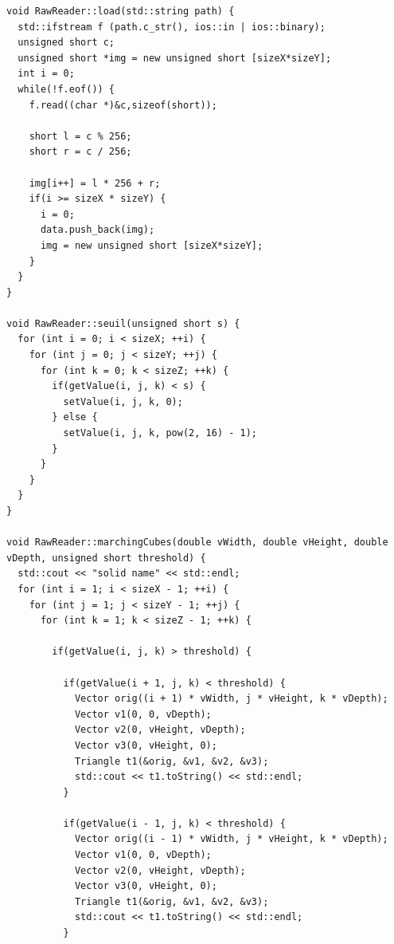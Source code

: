 \documentclass [a4 paper,11pt]{report}
\begin{document}
\begin{lstlisting}
void RawReader::load(std::string path) {
  std::ifstream f (path.c_str(), ios::in | ios::binary);
  unsigned short c;
  unsigned short *img = new unsigned short [sizeX*sizeY];
  int i = 0;
  while(!f.eof()) {
    f.read((char *)&c,sizeof(short));

    short l = c % 256;
    short r = c / 256;

    img[i++] = l * 256 + r;
    if(i >= sizeX * sizeY) {
      i = 0;
      data.push_back(img);
      img = new unsigned short [sizeX*sizeY];
    }
  }
}

void RawReader::seuil(unsigned short s) {
  for (int i = 0; i < sizeX; ++i) {
    for (int j = 0; j < sizeY; ++j) {
      for (int k = 0; k < sizeZ; ++k) {
        if(getValue(i, j, k) < s) {
          setValue(i, j, k, 0);
        } else {
          setValue(i, j, k, pow(2, 16) - 1);
        }
      }
    }
  }
}

void RawReader::marchingCubes(double vWidth, double vHeight, double vDepth, unsigned short threshold) {
  std::cout << "solid name" << std::endl;
  for (int i = 1; i < sizeX - 1; ++i) {
    for (int j = 1; j < sizeY - 1; ++j) {
      for (int k = 1; k < sizeZ - 1; ++k) {

        if(getValue(i, j, k) > threshold) {

          if(getValue(i + 1, j, k) < threshold) {
            Vector orig((i + 1) * vWidth, j * vHeight, k * vDepth);
            Vector v1(0, 0, vDepth);
            Vector v2(0, vHeight, vDepth);
            Vector v3(0, vHeight, 0);
            Triangle t1(&orig, &v1, &v2, &v3);
            std::cout << t1.toString() << std::endl;
          }

          if(getValue(i - 1, j, k) < threshold) {
            Vector orig((i - 1) * vWidth, j * vHeight, k * vDepth);
            Vector v1(0, 0, vDepth);
            Vector v2(0, vHeight, vDepth);
            Vector v3(0, vHeight, 0);
            Triangle t1(&orig, &v1, &v2, &v3);
            std::cout << t1.toString() << std::endl;
          }


\end{lstlisting}
\end{document}
